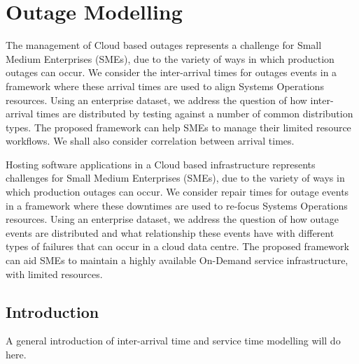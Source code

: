 
\chapter{Outage Modelling} %
\label{ch:OM}

\begin{textsl}
{\small The management of Cloud based outages represents a challenge for Small Medium Enterprises (SMEs), due to the variety of ways in which production outages can occur. We consider the inter-arrival times for outages events in a framework where these arrival times are used to align Systems Operations resources. Using an enterprise dataset, we address the question of how inter-arrival times are distributed by testing against a number of common distribution types. The proposed framework can help SMEs to manage their limited resource workflows. We shall also consider correlation between arrival times.

Hosting software applications in a Cloud based infrastructure represents challenges for Small Medium Enterprises (SMEs), due to the variety of ways in which production outages can occur. We consider repair times for outage events in a framework where these downtimes are used to re-focus Systems Operations resources. Using an enterprise dataset, we address the question of how outage events are distributed and what relationship these events have with different types of failures that can occur in a cloud data centre. The proposed framework can aid SMEs to maintain a highly available On-Demand service infrastructure, with limited resources.}
\end{textsl}

\vspace*{1cm}




\section{Introduction}
A general introduction of inter-arrival time and service time modelling will do here.

